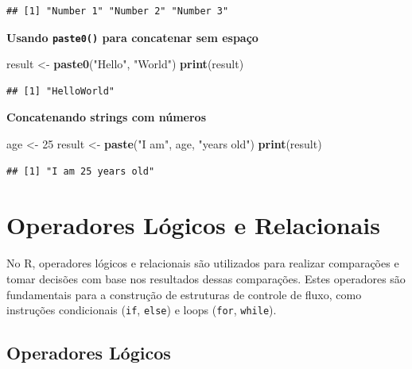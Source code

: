 \documentclass[
]{book}
\newenvironment{Shaded}{\begin{snugshade}}{\end{snugshade}}
\newcommand{\DecValTok}[1]{\textcolor[rgb]{0.00,0.00,0.81}{#1}}
\newcommand{\FunctionTok}[1]{\textcolor[rgb]{0.13,0.29,0.53}{\textbf{#1}}}
\newcommand{\NormalTok}[1]{#1}
\newcommand{\OtherTok}[1]{\textcolor[rgb]{0.56,0.35,0.01}{#1}}
\newcommand{\StringTok}[1]{\textcolor[rgb]{0.31,0.60,0.02}{#1}}
\theoremstyle{definition}
\theoremstyle{definition}
\theoremstyle{definition}
\theoremstyle{definition}
\theoremstyle{remark}
\begin{document}
\begin{verbatim}
## [1] "Number 1" "Number 2" "Number 3"
\end{verbatim}

\textbf{Usando \texttt{paste0()} para concatenar sem espaço}

\begin{Shaded}
\begin{Highlighting}[]
\NormalTok{result }\OtherTok{\textless{}{-}} \FunctionTok{paste0}\NormalTok{(}\StringTok{"Hello"}\NormalTok{, }\StringTok{"World"}\NormalTok{)}
\FunctionTok{print}\NormalTok{(result)}
\end{Highlighting}
\end{Shaded}

\begin{verbatim}
## [1] "HelloWorld"
\end{verbatim}

\textbf{Concatenando strings com números}

\begin{Shaded}
\begin{Highlighting}[]
\NormalTok{age }\OtherTok{\textless{}{-}} \DecValTok{25}
\NormalTok{result }\OtherTok{\textless{}{-}} \FunctionTok{paste}\NormalTok{(}\StringTok{"I am"}\NormalTok{, age, }\StringTok{"years old"}\NormalTok{)}
\FunctionTok{print}\NormalTok{(result)}
\end{Highlighting}
\end{Shaded}

\begin{verbatim}
## [1] "I am 25 years old"
\end{verbatim}

\section{Operadores Lógicos e Relacionais}\label{operadores-luxf3gicos-e-relacionais}

No R, operadores lógicos e relacionais são utilizados para realizar comparações e tomar decisões com base nos resultados dessas comparações. Estes operadores são fundamentais para a construção de estruturas de controle de fluxo, como instruções condicionais (\texttt{if}, \texttt{else}) e loops (\texttt{for}, \texttt{while}).

\subsection{Operadores Lógicos}\label{operadores-luxf3gicos}
\end{document}
